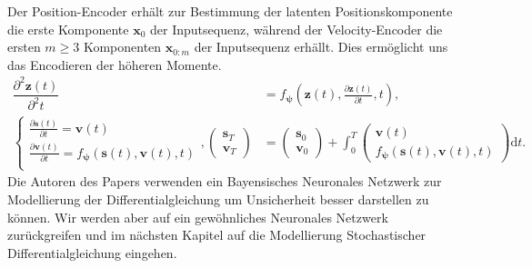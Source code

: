\documentclass[12pt]{article}
\begin{document}
	Der Position-Encoder erhält zur Bestimmung der latenten Positionskomponente die erste Komponente $\mathbf x_{0}$ der Inputsequenz, während der Velocity-Encoder die ersten $m\geq 3$ Komponenten $\mathbf x_{0:m}$ der Inputsequenz erhällt. Dies ermöglicht uns das Encodieren der höheren Momente.
	\begin{align*}
	\dfrac{\partial^2 \mathbf{z}(t)}{\partial^2 t}&=f_{\boldsymbol{\psi}}\left(\mathbf{z}(t), \tfrac{\partial \mathbf{z}(t)}{\partial t}, t\right), \\
	\begin{cases*}
	\tfrac{\partial \mathbf{s}(t)}{\partial t}=\mathbf v(t) \\
	\tfrac{\partial \mathbf{v}(t)}{\partial t}=f_{\boldsymbol{\psi}}(\mathbf s(t), \mathbf v(t), t) \\
	\end{cases*},
	\left(\begin{array}{cc}
	\mathbf s_{T} \\
	\mathbf v_{T}
	\end{array}\right)
	&=
	\left(\begin{array}{cc}
	\mathbf s_{0} \\
	\mathbf v_{0}
	\end{array}\right)
	+
	\int_{0}^{T}
	\left(\begin{array}{cc}
	\mathbf v(t) \\
	f_{\boldsymbol{\psi}}(\mathbf s(t), \mathbf v(t), t)
	\end{array}\right)
	\mathrm{d}t.
	\end{align*}
	Die Autoren des Papers verwenden ein Bayensisches Neuronales Netzwerk zur Modellierung der Differentialgleichung um Unsicherheit besser darstellen zu können. Wir werden aber auf ein gewöhnliches Neuronales Netzwerk zurückgreifen und im nächsten Kapitel auf die Modellierung Stochastischer Differentialgleichung eingehen.
\end{document}
